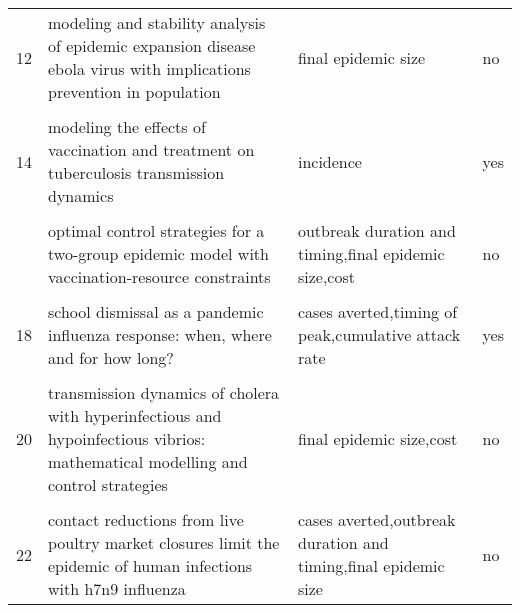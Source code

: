 \documentclass[
]{article}
\begin{document}
\begin{landscape}
\begin{longtable}{l>{\raggedright\arraybackslash}p{4cm}>{\raggedright\arraybackslash}p{6cm}l}
12 & modeling and stability analysis of epidemic expansion disease ebola virus with implications prevention in population & final epidemic size & no\\
\cellcolor{gray!6}{13} & \cellcolor{gray!6}{modeling the effectiveness of respiratory protective devices in reducing influenza outbreak} & \cellcolor{gray!6}{attack rate,prevalence of infection} & \cellcolor{gray!6}{yes}\\
14 & modeling the effects of vaccination and treatment on tuberculosis transmission dynamics & incidence & yes\\
\cellcolor{gray!6}{15} & \cellcolor{gray!6}{optimal control and cost-effective analysis of the 2017 meningitis outbreak in nigeria} & \cellcolor{gray!6}{cases averted,cost} & \cellcolor{gray!6}{yes}\\
\addlinespace
16 & optimal control strategies for a two-group epidemic model with vaccination-resource constraints & outbreak duration and timing,final epidemic size,cost & no\\
\cellcolor{gray!6}{17} & \cellcolor{gray!6}{optimal media reporting intensity on mitigating spread of an emerging infectious disease} & \cellcolor{gray!6}{final epidemic size,peak magnitude} & \cellcolor{gray!6}{yes}\\
18 & school dismissal as a pandemic influenza response: when, where and for how long? & cases averted,timing of peak,cumulative attack rate & yes\\
\cellcolor{gray!6}{19} & \cellcolor{gray!6}{study on modeling simulation and optimal control method for the transmission risk of the ebola virus} & \cellcolor{gray!6}{number of individuals in s,number of susceptible individuals,number of latently infected individuals,isolated or quarantined individuals,and the individuals that have recovered and are immune to evd} & \cellcolor{gray!6}{yes}\\
20 & transmission dynamics of cholera with hyperinfectious and hypoinfectious vibrios: mathematical modelling and control strategies & final epidemic size,cost & no\\
\addlinespace
\cellcolor{gray!6}{21} & \cellcolor{gray!6}{a new epidemics–logistics model: insights into controlling the ebola virus disease in west africa} & \cellcolor{gray!6}{funerals,cumulative infections} & \cellcolor{gray!6}{yes}\\
22 & contact reductions from live poultry market closures limit the epidemic of human infections with h7n9 influenza & cases averted,outbreak duration and timing,final epidemic size & no\\

\end{longtable}
\end{landscape}
\end{document}
